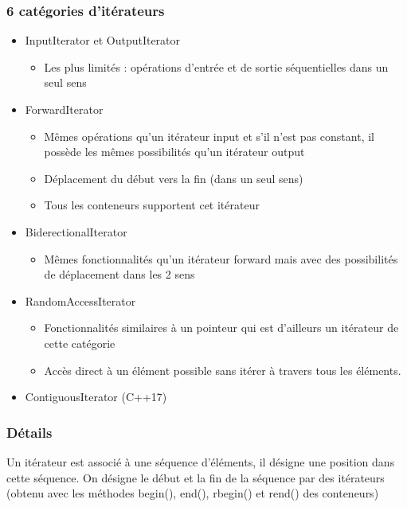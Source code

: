 \documentclass[10pt,a4paper,twoside]{article}
\begin{document}
\subsubsection{6 catégories d'itérateurs}
\begin{itemize}
\item InputIterator et OutputIterator
\begin{itemize}
\item Les plus limités : opérations d'entrée et de sortie séquentielles dans un seul sens
\end{itemize}
\item ForwardIterator
\begin{itemize}
\item Mêmes opérations qu'un itérateur input et s'il n'est pas constant, il possède les mêmes possibilités qu'un itérateur output
\item Déplacement du début vers la fin (dans un seul sens)
\item Tous les conteneurs supportent cet itérateur
\end{itemize}
\item BiderectionalIterator
\begin{itemize}
\item Mêmes fonctionnalités qu'un itérateur forward mais avec des possibilités de déplacement dans les 2 sens
\end{itemize}
\item RandomAccessIterator
\begin{itemize}
\item Fonctionnalités similaires à un pointeur qui est d'ailleurs un itérateur de cette catégorie
\item Accès direct à un élément possible sans itérer à travers tous les éléments.
\end{itemize}
\item ContiguousIterator (C++17)
\end{itemize}

\subsubsection{Détails}
Un itérateur est associé à une séquence d'éléments, il désigne une position dans cette séquence. On désigne le début et la fin de la séquence par des itérateurs (obtenu avec les méthodes begin(), end(), rbegin() et rend() des conteneurs)
\end{document}

